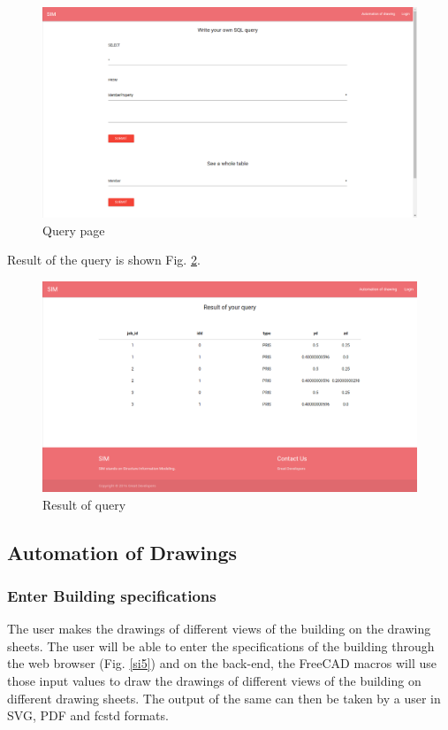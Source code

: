 \begin{figure}[h!]
\begin{center}
\includegraphics[scale=0.33]{images/query.png}
\caption{Query page}
\label{si3}  
\end{center}
\end{figure}

Result of the query is shown Fig. \ref{si4}.

\begin{figure}[h!]
\begin{center}
\includegraphics[scale=0.33]{images/result_query.png}
\caption{Result of query}
\label{si4}  
\end{center}
\end{figure}

\subsection{Automation of Drawings}
\subsubsection{Enter Building specifications}
The user makes the drawings of different views of the building on the
drawing sheets. The user will be able to enter the specifications of the building through the web
browser (Fig. \ref{si5}) and on the back-end, the FreeCAD macros will use those input values to draw the drawings of different views of the building on different drawing
sheets. The output of the same can then be taken by a user in SVG, PDF and fcstd formats.

